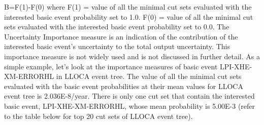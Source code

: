 B=F(1)-F(0)
where F(1) = value of all the minimal cut sets evaluated with the interested basic event probability set to 1.0.
    F(0) = value of all the minimal cut sets evaluated with the interested basic event probability set to 0.0.
The Uncertainty Importance measure is an indication of the contribution of the interested basic event’s uncertainty to the total output uncertainty. This importance measure is not widely used and is not discussed in further detail.
As a simple example, let’s look at the importance measures of basic event LPI-XHE-XM-ERRORHL in LLOCA event tree. The value of all the minimal cut sets evaluated with the basic event probabilities at their mean values for LLOCA event tree is 2.036E-8/year. There is only one cut set that contain the interested basic event, LPI-XHE-XM-ERRORHL, whose mean probability is 5.00E-3 (refer to the table below for top 20 cut sets of LLOCA event tree).


